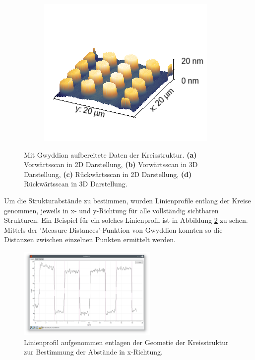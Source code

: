 \begin{figure}[H]
\begin{subfigure}{0.49\textwidth}
        \includegraphics[width=\textwidth]{bilder/Mikrostruktur/Kreis_Bac_3D.png}
        \caption{}
    \end{subfigure}
    \caption{Mit Gwyddion aufbereitete Daten der Kreisstruktur. \textbf{(a)} Vorwärtsscan in 2D Darstellung, \textbf{(b)} Vorwärtsscan in 3D Darstellung, \textbf{(c)} Rückwärtsscan in 2D Darstellung, \textbf{(d)} Rückwärtsscan in 3D Darstellung.}
    \label{fig:KREIS2}
\end{figure}
Um die Strukturabstände zu bestimmen, wurden Linienprofile entlang der Kreise genommen, 
jeweils in x- und y-Richtung für alle vollständig sichtbaren Strukturen. Ein Beispiel für ein solches Linienprofil ist in Abbildung \ref{fig:KREISE3}
zu sehen. Mittels der 'Measure Distances'-Funktion von Gwyddion konnten so die Distanzen zwischen einzelnen Punkten ermittelt werden.
\begin{figure}[H]
    \centering
    \includegraphics[width=0.6\textwidth]{bilder/Mikrostruktur/LineProfile.png}
    \caption{Linienprofil aufgenommen entlagen der Geometie der Kreisstruktur zur Bestimmung der Abstände in x-Richtung.}
    \label{fig:KREISE3}
\end{figure}


